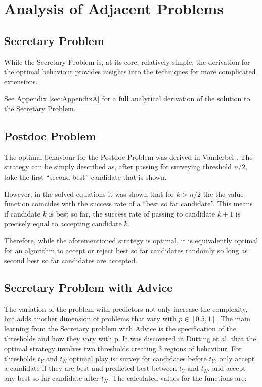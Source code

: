 \documentclass[a4paper,11pt]{article}
\begin{document}
\section{Analysis of Adjacent Problems}
\label{sec:synthesis}

\subsection{Secretary Problem}

While the Secretary Problem is, at its core, relatively simple, the derivation for the optimal behaviour provides insights into the techniques for more complicated extensions.

See Appendix \ref{sec:AppendixA} for a full analytical derivation of the solution to the Secretary Problem.

\subsection{Postdoc Problem}

The optimal behaviour for the Postdoc Problem was derived in Vanderbei \cite{vanderbei2011postdoc}. The strategy can be simply described as, after passing for surveying threshold $n/2$, take the first ``second best'' candidate that is shown.

However, in the solved equations it was shown that for $k > n/2$ the the value function coincides with the success rate of a ``best so far candidate''. This means if candidate $k$ is best so far, the success rate of passing to candidate $k+1$ is precisely equal to accepting candidate $k$.

Therefore, while the aforementioned strategy is optimal, it is equivalently optimal for an algorithm to accept or reject best so far candidates randomly so long as second best so far candidates are accepted.

\subsection{Secretary Problem with Advice}

The variation of the problem with predictors not only increase the complexity, but adds another dimension of problems that vary with $p \in [0.5,1]$. The main learning from the Secretary problem with Advice is the specification of the thresholds and how they vary with p. It was discovered in D\"utting et al. \cite{dütting2020secretariesadvice} that the optimal strategy involves two thresholds creating 3 regions of behaviour. For thresholds $t_Y$ and $t_N$ optimal play is: survey for candidates before $t_Y$, only accept a candidate if they are best and predicted best between $t_Y \text{ and } t_N$, and accept any best so far candidate after $t_N$. The calculated values for the functions are:
\end{document}
